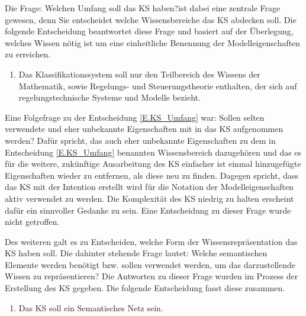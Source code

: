 Die Frage: \glqq Welchen Umfang soll das KS haben?\grqq ist dabei eine zentrale Frage gewesen, denn Sie entscheidet welche Wissensbereiche das KS abdecken soll. Die folgende Entscheidung beantwortet diese Frage und basiert auf der Überlegung, welches Wissen nötig ist um eine einheitliche Benennung der Modelleigenschaften zu erreichen. 
\begin{enumerate}[resume*]
	\item \label{E.KS_Umfang}Das Klassifikationssystem soll nur den Teilbereich des Wissens der Mathematik, sowie Regelungs- und Steuerungstheorie enthalten, der sich auf regelungstechnische Systeme und Modelle bezieht.
\end{enumerate}

Eine Folgefrage zu der Entscheidung \ref{E.KS_Umfang} war: Sollen selten verwendete und eher unbekannte Eigenschaften mit in das KS aufgenommen werden? Dafür spricht, das auch eher unbekannte Eigenschaften zu dem in Entscheidung \ref{E.KS_Umfang} benannten Wissensbereich dazugehören und das es für die weitere, zukünftige Ausarbeitung des KS einfacher ist einmal hinzugefügte Eigenschaften wieder zu entfernen, als diese neu zu finden. Dagegen spricht, dass das KS mit der Intention erstellt wird für die Notation der Modelleigenschaften aktiv verwendet zu werden. Die Komplexität des KS niedrig zu halten erscheint dafür ein sinnvoller Gedanke zu sein. Eine Entscheidung zu dieser Frage wurde nicht getroffen.

Des weiteren galt es zu Entscheiden, welche Form der Wissensrepräsentation das KS haben soll. Die dahinter stehende Frage lautet: Welche semantischen Elemente werden benötigt bzw. sollen verwendet werden, um das darzustellende Wissen zu repräsentieren? Die Antworten zu dieser Frage wurden im Prozess der Erstellung des KS gegeben. Die folgende Entscheidung fasst diese zusammen.
\begin{enumerate}[resume*]
	\item \label{E.KS_SemantischesNetz}Das KS soll ein Semantisches Netz sein. %
\end{enumerate}

